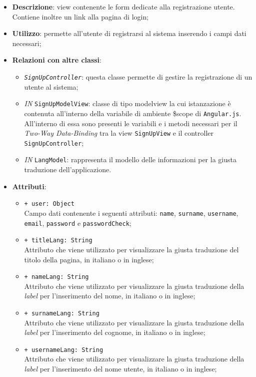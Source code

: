 \begin{itemize}
	\item \textbf{Descrizione}: view contenente le form dedicate alla registrazione utente. Contiene inoltre un link alla pagina di login;
	\item \textbf{Utilizzo}: permette all'utente di registrarsi al sistema inserendo i campi dati necessari;
	\item \textbf{Relazioni con altre classi}:
	\begin{itemize}
		\item \textit \texttt{SignUpController}: questa classe permette di gestire la registrazione di un utente al sistema;
		\item \textit{IN} \texttt{SignUpModelView}: classe di tipo modelview la cui istanzazione è contenuta all'interno della variabile di ambiente \$scope di \texttt{Angular.js}. All'interno di essa sono presenti le variabili e i metodi necessari per il \textit{Two-Way Data-Binding} tra la view \texttt{SignUpView} e il controller \texttt{SignUpController};
		\item \textit{IN} \texttt{LangModel}: rappresenta il modello delle informazioni per la giusta traduzione dell'applicazione.
	\end{itemize}
	\item \textbf{Attributi}:
	\begin{itemize}
		\item \texttt{+ user: Object} \\ Campo dati contenente i seguenti attributi: \texttt{name}, \texttt{surname}, \texttt{username}, \texttt{email}, \texttt{password} e \texttt{passwordCheck};
		\item \texttt{+ titleLang: String} \\ Attributo che viene utilizzato per visualizzare la giusta traduzione del titolo della pagina, in italiano o in inglese;
		\item \texttt{+ nameLang: String} \\ Attributo che viene utilizzato per visualizzare la giusta traduzione della \textit{label} per l'inserimento del nome, in italiano o in inglese;
		\item \texttt{+ surnameLang: String} \\ Attributo che viene utilizzato per visualizzare la giusta traduzione della \textit{label} per l'inserimento del cognome, in italiano o in inglese;
		\item \texttt{+ usernameLang: String} \\ Attributo che viene utilizzato per visualizzare la giusta traduzione della \textit{label} per l'inserimento del nome utente, in italiano o in inglese;

\end{itemize}
\end{itemize}
